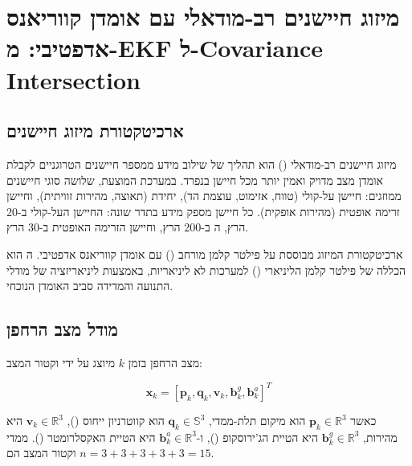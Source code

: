 

\section{מיזוג חיישנים רב-מודאלי עם אומדן קווריאנס אדפטיבי: מ-EKF ל-Covariance Intersection}
\label{sec:ch05_fusion}

\subsection{ארכיטקטורת מיזוג חיישנים}
\label{sec:ch05_architecture}

מיזוג חיישנים רב-מודאלי () הוא תהליך של שילוב מידע ממספר חיישנים הטרוגניים לקבלת אומדן מצב מדויק ואמין יותר מכל חיישן בנפרד. במערכת המוצעת, שלושה סוגי חיישנים ממוזגים: חיישן על-קולי (טווח, אזימוט, עוצמת הד), יחידת  (תאוצה, מהירות זוויתית), וחיישן זרימה אופטית (מהירות אופקית). כל חיישן מספק מידע בתדר שונה: החיישן העל-קולי ב-20 הרץ, ה ב-200 הרץ, וחיישן הזרימה האופטית ב-30 הרץ. \cite{Thrun2005ProbRobotics}

ארכיטקטורת המיזוג מבוססת על פילטר קלמן מורחב () עם אומדן קווריאנס אדפטיבי. ה הוא הכללה של פילטר קלמן הליניארי () למערכות לא ליניאריות, באמצעות ליניאריזציה של מודלי התנועה והמדידה סביב האומדן הנוכחי. \cite{Kalman1960}

\subsection{מודל מצב הרחפן}
\label{sec:ch05_state_model}

מצב הרחפן בזמן $k$ מיוצג על ידי וקטור המצב:

\begin{equation}
\mathbf{x}_k = [\mathbf{p}_k, \mathbf{q}_k, \mathbf{v}_k, \mathbf{b}_k^g, \mathbf{b}_k^a]^T
\label{eq:ch05_state_vector}
\end{equation}

כאשר $\mathbf{p}_k \in \mathbb{R}^3$ הוא מיקום תלת-ממדי, $\mathbf{q}_k \in \mathbb{S}^3$ הוא קווטרניון ייחוס (), $\mathbf{v}_k \in \mathbb{R}^3$ היא מהירות, $\mathbf{b}_k^g \in \mathbb{R}^3$ היא הטיית הג'ירוסקופ (), ו-$\mathbf{b}_k^a \in \mathbb{R}^3$ היא הטיית האקסלרומטר (). ממדי וקטור המצב הם $n = 3 + 3 + 3 + 3 + 3 = 15$. \cite{Thrun2005ProbRobotics}

